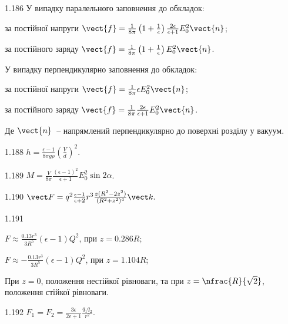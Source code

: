 \begin{Solution}{1.{186}}
		У випадку паралельного заповнення до обкладок:
		\begin{enumerate*}[label=\alph*)]
			\item за постійної напруги
			$\vect{f} = \frac{1}{8\pi}\left( 1+\frac1\epsilon\right) \frac{2\epsilon}{\epsilon + 1} E_0^2 \vect{n}$;
			\item за постійного заряду
			$\vect{f} = \frac{1}{8\pi}\left( 1+\frac1\epsilon\right) E_0^2 \vect{n}$.
		\end{enumerate*}
		У випадку перпендикулярно заповнення до обкладок:
		\begin{enumerate*}[label=\alph*)]
			\item за постійної напруги
			$\vect{f} = \frac{1}{8\pi}\epsilon E_0^2 \vect{n}$;
			\item за постійного заряду
			$\vect{f} = \frac{1}{8\pi} \frac{2\epsilon }{\epsilon + 1} E_0^2 \vect{n}$.
		\end{enumerate*}
		Де $\vect{n}$~-- напрямлений перпендикулярно до поверхні розділу у вакуум.
	
\end{Solution}
\begin{Solution}{1.{188}}
	$h = \frac{\epsilon - 1}{8\pi g \rho} \left(\frac{V}{d} \right)^2$.
\end{Solution}
\begin{Solution}{1.{189}}
	$M = \frac{V}{8\pi} \frac{(\epsilon - 1)^2}{\epsilon + 1} E_0^2\sin2\alpha$.
\end{Solution}
\begin{Solution}{1.{190}}
	$\vect F = q^2\frac{\epsilon - 1}{\epsilon + 2}r^3 \frac{z(R^2 - 2z^2)}{(R^2 + z^2)^4} \vect k.$
\end{Solution}
\begin{Solution}{1.{191}}
	\begin{enumerate*}[label=\alph*)]
		\item $F \approx \frac{0.13r^3}{3R^5} (\epsilon - 1) Q^2$, при $z = 0.286 R$;
		\item $F \approx - \frac{0.13r^3}{3R^5} (\epsilon - 1) Q^2$, при $z = 1.104 R$;
		\item При $z = 0$, положення нестійкої рівноваги, та при $z = \nfrac{R}{\sqrt2}$, положення стійкої рівноваги.
	\end{enumerate*}
\end{Solution}
\begin{Solution}{1.{192}}
	$F_1 = F_2 = \frac{3\epsilon}{2\epsilon + 1}\frac{q_1q_2}{r^2}$.
\end{Solution}
